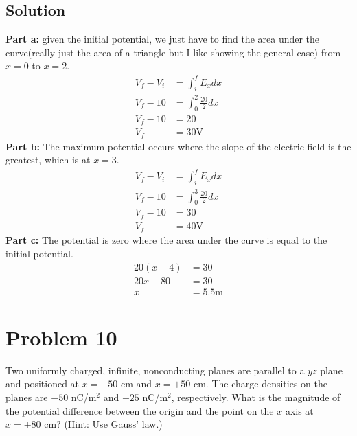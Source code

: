 \documentclass{article}
\newcommand{\m}{\text{m}}
\newcommand{\V}{\text{V}}
\begin{document}
\subsection*{Solution}
\textbf{Part a:}
given the initial potential, we just have to find the area under the curve(really just the area of a triangle but I like showing the general case) from $x=0$ to $x=2$.
\begin{align*}
	V_f - V_i &= \int_i^f E_x dx \\
	V_f - 10&= \int_0^2 \frac{20}{2} dx \\
	V_f - 10 &= 20 \\
	V_f &= \boxed{30 \V}
\end{align*}
\textbf{Part b:} The maximum potential occurs where the slope of the electric field is the greatest, which is at $x=3$.
\begin{align*}
	V_f - V_i &= \int_i^f E_x dx \\
	V_f - 10&= \int_0^3 \frac{20}{2} dx \\
	V_f - 10 &= 30 \\
	V_f &= \boxed{40 \V}
\end{align*}
\textbf{Part c:} The potential is zero where the area under the curve is equal to the initial potential.
\begin{align*}
	20(x-4)&=30 \\
	20x - 80 &= 30 \\
	x &= \boxed{5.5 \m}
\end{align*}

\section*{Problem 10}
Two uniformly charged, infinite, nonconducting planes are parallel to a $yz$ plane and positioned at $x = -50$ cm and $x = +50$ cm. The charge densities on the planes are $-50$ nC/m$^2$ and $+25$ nC/m$^2$, respectively. What is the magnitude of the potential difference between the origin and the point on the $x$ axis at $x = +80$ cm? (Hint: Use Gauss' law.)
\end{document}
